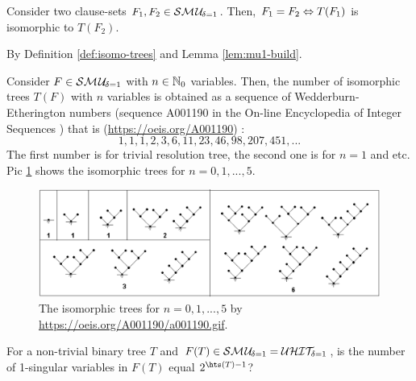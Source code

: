 \documentclass{report}
\begin{document}
\begin{lem}\label{lem:mu1-iso}
Consider two clause-sets $F_1,F_2 \in \mathcal{S}\mathcal{M\hspace{0.8pt}U}_{\!\delta=1}$. Then, $F_1=F_2 \Leftrightarrow T(F_1) $ is isomorphic to $T(F_2)$.
\end{lem}    
\begin{prf}
By Definition \ref{def:isomo-trees} and Lemma \ref{lem:mu1-build}.
\end{prf}                                                                                                     
                                                                                                                        
\begin{lem}\label{lem:mu1-iso-num}
Consider $F \in \mathcal{S}\mathcal{M\hspace{0.8pt}U}_{\!\delta=1}$ with $n \in \mathbb{N}_0$ variables. Then, the number of isomorphic trees $T(F)$ with $n$ variables is obtained as a sequence of Wedderburn-Etherington numbers (sequence A001190 in the On-line Encyclopedia of Integer Sequences \cite{Sloane2008OEIS}) that is (\url{https://oeis.org/A001190}) :
\begin{displaymath}
 1, 1, 1, 2, 3, 6, 11, 23, 46, 98, 207, 451, ...
\end{displaymath}
The first number is for trivial resolution tree, the second one is for $n=1$ and etc. Pic \ref{fig:isotree} shows the isomorphic trees for $n=0,1,..., 5$.
 \begin{figure}
   \begin{center}
   \includegraphics[scale =0.45]{a001190.png}
   \caption{The isomorphic trees for $n=0,1,..., 5$ by \url{https://oeis.org/A001190/a001190.gif}.}
   \label{fig:isotree}
   \end{center}
   \end{figure}
\end{lem}   
                             
\begin{quest}\label{que:hitnum}
For a non-trivial binary tree $T$ and $F(T) \in \mathcal{S}\mathcal{M\hspace{0.8pt}U}_{\!\delta=1}=\mathcal{U}\mathcal{HIT}_{\!\!\delta=1}$, is the number of 1-singular variables in $F(T)$ equal $2^{\hts(T)-1}$?
\end{quest}
\end{document}
